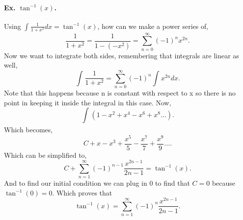 \paragraph{Ex. $ \tan^{ -1 } \left( x \right)  $. }
Using $ \int_{  }^{  } \frac{ 1 }{ 1+x^2 } dx= \tan^{ -1 } \left( x \right)  $, how can we make a power series of,
\[
\frac{ 1 }{ 1+x^2 } = \frac{ 1 }{ 1 - \left( -x^2 \right)  } = \sum_{ n=0 } ^{ \infty } \left( -1 \right) ^{ n }x^{ 2n }
.\] 
Now we want to integrate both sides, remembering that integrals are linear as well,
\[
\int_{  }^{  } \frac{ 1 }{ 1+x^2 } = \sum_{ n=0 } ^{ \infty } \left( -1 \right) ^{ n }\int_{  }^{  } x^{ 2n }dx
.\] 
Note that this happens because n is constant with respect to x so there is no point in keeping it inside the integral in this case. Now,
\[
\int_{  }^{  } \left( 1-x^2 + x^{ 4 }- x^{ 6 } + x^{ 8 }\ldots\right) 
.\] 
Which becomes,
\[
C + x-x^3 + \frac{ x^5 }{ 5 } - \frac{ x^7 }{ 7 } + \frac{ x^9 }{ 9 } \ldots
.\] 
Which can be simplified to,
\[
C+ \sum_{ n=1 } ^{ \infty } \left( -1 \right) ^{ n-1 }\frac{ x^{ 2n-1 } }{ 2n-1 } = \tan^{ -1 } \left( x \right) 
.\] 
And to find our initial condition we can plug in 0 to find that $ C=0 $ because $ \tan^{ -1 } \left( 0 \right) =0 $. Which proves that 
\[
\tan^{ -1 } \left( x \right) = \sum_{ n=1 } ^{ \infty } \left( -1 \right) ^{ n }\frac{ x^{ 2n-1 } }{ 2n-1 }
.\] 
